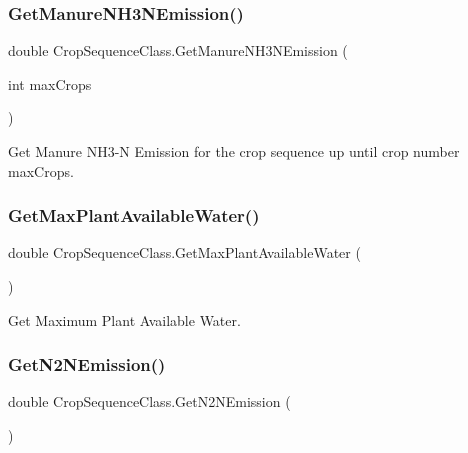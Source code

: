 \subsubsection{\texorpdfstring{GetManureNH3NEmission()}{GetManureNH3NEmission()}\hspace{0.1cm}{\footnotesize\ttfamily [2/2]}}
{\footnotesize\ttfamily double Crop\+Sequence\+Class.\+Get\+Manure\+N\+H3\+N\+Emission (\begin{DoxyParamCaption}\item[{int}]{max\+Crops }\end{DoxyParamCaption})\hspace{0.3cm}{\ttfamily [inline]}}



Get Manure N\+H3-\/N Emission for the crop sequence up until crop number max\+Crops. 

\mbox{\label{class_crop_sequence_class_ae4d5d6dc25fed5326716a2ce9f9ee1cd}} 
\subsubsection{\texorpdfstring{GetMaxPlantAvailableWater()}{GetMaxPlantAvailableWater()}}
{\footnotesize\ttfamily double Crop\+Sequence\+Class.\+Get\+Max\+Plant\+Available\+Water (\begin{DoxyParamCaption}{ }\end{DoxyParamCaption})\hspace{0.3cm}{\ttfamily [inline]}}



Get Maximum Plant Available Water. 

\mbox{\label{class_crop_sequence_class_adf241517ee886bcd1a918d74bcd4ee11}} 
\subsubsection{\texorpdfstring{GetN2NEmission()}{GetN2NEmission()}\hspace{0.1cm}{\footnotesize\ttfamily [1/2]}}
{\footnotesize\ttfamily double Crop\+Sequence\+Class.\+Get\+N2\+N\+Emission (\begin{DoxyParamCaption}{ }\end{DoxyParamCaption})\hspace{0.3cm}{\ttfamily [inline]}}



